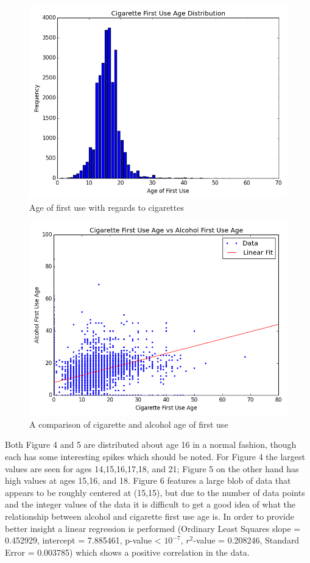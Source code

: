 \documentclass[a4 paper]{article}
\begin{document}
\begin{figure}[H]
	\centering
	\includegraphics[width=5in]{images/cigAFU}
	\caption{Age of first use with regards to cigarettes}
\end{figure}

\begin{figure}[H]
	\centering
	\includegraphics[width=5in]{images/cigVsAlcAFU}
	\caption{A comparison of cigarette and alcohol age of first use}
\end{figure}

Both Figure 4 and 5 are distributed about age 16 in a normal fashion, though each has some interesting spikes which should be noted. For Figure 4 the largest values are seen for ages 14,15,16,17,18, and 21; Figure 5 on the other hand has high values at ages 15,16, and 18. Figure 6 features a large blob of data that appears to be roughly centered at (15,15), but due to the number of data points and the integer values of the data it is difficult to get a good idea of what the relationship between alcohol and cigarette first use age is. In order to provide better insight a linear regression is performed (Ordinary Least Squares slope = 0.452929, intercept = 7.885461, p-value < $10^{-7}$, $r^2$-value = 0.208246, Standard Error = 0.003785) which shows a positive correlation in the data. \\
\end{document}
